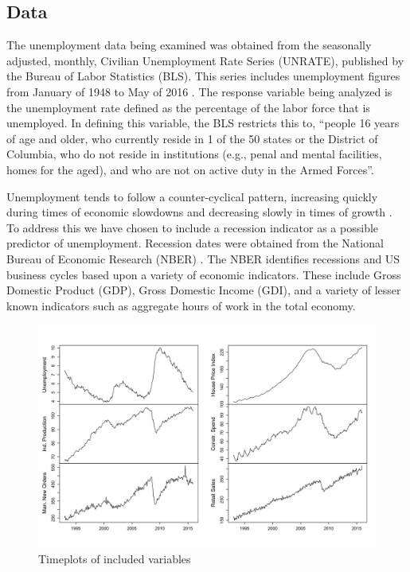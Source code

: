 \documentclass[twoside,twocolumn]{article}
\begin{document}
\subsection{Data}

The unemployment data being examined was obtained from the seasonally adjusted, monthly, Civilian Unemployment Rate Series (UNRATE), published by the Bureau of Labor Statistics (BLS).  This series includes unemployment figures from January of 1948 to  May of 2016 \citep{blsrefsa}.  The response variable being analyzed is the unemployment rate defined as the percentage of the labor force that is unemployed.  In defining this variable, the BLS restricts this to, ``people 16 years of age and older, who currently reside in 1 of the 50 states or the District of Columbia, who do not reside in institutions (e.g., penal and mental facilities, homes for the aged), and who are not on active duty in the Armed Forces''.

Unemployment tends to follow a counter-cyclical pattern, increasing quickly during times of economic slowdowns and decreasing slowly in times of growth \citep{Montgomery1998}. To address this we have chosen to include a recession indicator as a possible predictor of unemployment. Recession dates were obtained from the National Bureau of Economic Research (NBER) \citep{NBER2016}. The NBER identifies recessions and US business cycles based upon a variety of economic indicators. These include Gross Domestic Product (GDP), Gross Domestic Income (GDI), and a variety of lesser known indicators such as aggregate hours of work in the total economy.

\begin{figure}[H]
	\centering
	\caption{Timeplots of included variables}
	\label{fig:predictors}
	\includegraphics[width=\linewidth]{images/predictors}
\end{figure}
\end{document}

